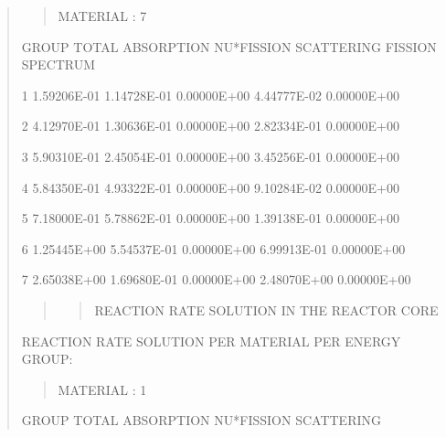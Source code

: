 \documentclass[letterpaper,10pt,english]{sphinxmanual}
\begin{document}
\begin{quote}
\begin{quote}
MATERIAL :   7
\end{quote}

\begin{DUlineblock}{0em}
\item[] GROUP           TOTAL        ABSORPTION      NU*FISSION      SCATTERING      FISSION SPECTRUM       \textbar{}
\end{DUlineblock}

\begin{DUlineblock}{0em}
\item[] 1          1.59206E-01     1.14728E-01     0.00000E+00     4.44777E-02     0.00000E+00           \textbar{}
\item[] 2          4.12970E-01     1.30636E-01     0.00000E+00     2.82334E-01     0.00000E+00           \textbar{}
\item[] 3          5.90310E-01     2.45054E-01     0.00000E+00     3.45256E-01     0.00000E+00           \textbar{}
\item[] 4          5.84350E-01     4.93322E-01     0.00000E+00     9.10284E-02     0.00000E+00           \textbar{}
\item[] 5          7.18000E-01     5.78862E-01     0.00000E+00     1.39138E-01     0.00000E+00           \textbar{}
\item[] 6          1.25445E+00     5.54537E-01     0.00000E+00     6.99913E-01     0.00000E+00           \textbar{}
\item[] 7          2.65038E+00     1.69680E-01     0.00000E+00     2.48070E+00     0.00000E+00           \textbar{}
\end{DUlineblock}
\begin{quote}
\begin{quote}

REACTION RATE SOLUTION IN THE REACTOR CORE
\end{quote}
\end{quote}

REACTION RATE SOLUTION PER MATERIAL PER ENERGY  GROUP:
\begin{quote}

MATERIAL :   1
\end{quote}

\begin{DUlineblock}{0em}
\item[] GROUP           TOTAL        ABSORPTION      NU*FISSION      SCATTERING        \textbar{}
\end{DUlineblock}


\end{quote}
\end{document}
